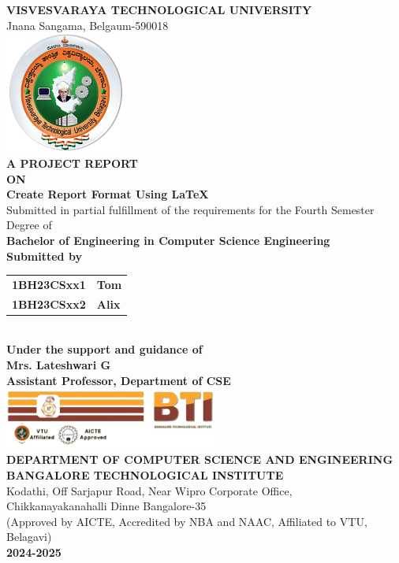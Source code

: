 \documentclass[a4paper,12pt]{article}
\begin{document}
\begin{titlepage}
    \centering
        {\large \textbf{VISVESVARAYA TECHNOLOGICAL UNIVERSITY}}\\
        \small{Jnana Sangama, Belgaum-590018}\\[0.5cm]
        \includegraphics[width=4cm]{resources/vtu.png} \\[0.5cm]
        
        {\large \textbf{A PROJECT REPORT}}\\[0.2cm]
        {\large \textbf{ON}}\\[0.2cm]
        {\Large \textbf{Create Report Format Using LaTeX}}\\[1.5cm]
        
        Submitted in partial fulfillment of the requirements for the Fourth Semester Degree of\\[0.2cm]
        {\Large \textbf{Bachelor of Engineering in Computer Science Engineering}}\\[0.5cm]
        
        \textbf{Submitted by}\\[0.5cm]
        \begin{tabular}{l l}
            \textbf{1BH23CSxx1} & \textbf{Tom} \\
            \textbf{1BH23CSxx2} & \textbf{Alix}
        \end{tabular}\\[1cm]

        
        \textbf{Under the support and guidance of}\\
        \textbf{Mrs. Lateshwari G}\\
        \textbf{Assistant Professor, Department of CSE}\\[1cm]
        
        \includegraphics[width=7cm]{resources/logo.png}\\[1cm]
        
        \textbf{DEPARTMENT OF COMPUTER SCIENCE AND ENGINEERING}\\[0.2cm]
        \large \textbf{BANGALORE TECHNOLOGICAL INSTITUTE}\\[0.1cm]
        \normalsize Kodathi, Off Sarjapur Road, Near Wipro Corporate Office,\\
        Chikkanayakanahalli Dinne Bangalore-35\\[0.1cm]
        \small {(Approved by AICTE, Accredited by NBA and NAAC, Affiliated to VTU, Belagavi)}\\[0.5cm]
        
        \textbf{2024-2025}
\end{titlepage}
\end{document}
